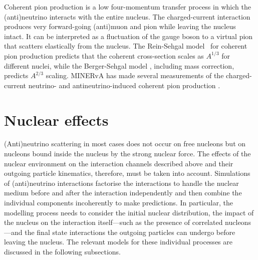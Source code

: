 Coherent pion production is a low four-momentum transfer process in which the (anti)neutrino interacts with the entire nucleus. The charged-current interaction produces very forward-going (anti)muon and pion while leaving the nucleus intact. It can be interpreted as a fluctuation of the gauge boson to a virtual pion that scatters elastically from the nucleus. The Rein-Sehgal model~\cite{coherent_REIN198329} for coherent pion production predicts that the coherent cross-section scales as $A^{1/3}$ for different nuclei, while the Berger-Sehgal model \cite{coherentMass_REIN2007207}, including mass correction, predicts $A^{2/3}$ scaling. MINERvA has made several measurements of the charged-current neutrino- and antineutrino-induced coherent pion production \cite{PhysRevLett.113.261802, PhysRevD.97.032014, PhysRevLett.131.051801}. 

\section{Nuclear effects}

(Anti)neutrino scattering in most cases does not occur on free nucleons but on nucleons bound inside the nucleus by the strong nuclear force. The effects of the nuclear environment on the interaction channels described above and their outgoing particle kinematics, therefore, must be taken into account. Simulations of (anti)neutrino interactions factorise the interactions to handle the nuclear medium before and after the interaction independently and then combine the individual components incoherently to make predictions. In particular, the modelling process needs to consider the initial nuclear distribution, the impact of the nucleus on the interaction itself---such as the presence of correlated nucleons---and the final state interactions the outgoing particles can undergo before leaving the nucleus. The relevant models for these individual processes are discussed in the following subsections.

 

